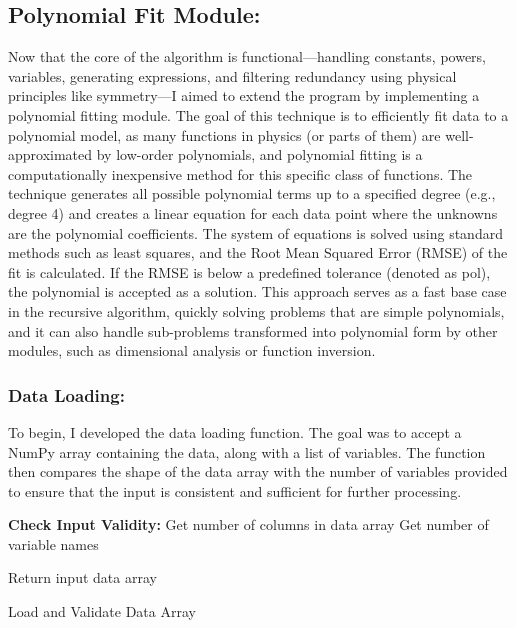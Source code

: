 \documentclass{article}
\begin{document}
\subsection{Polynomial Fit Module: }

Now that the core of the algorithm is functional—handling constants, powers, variables, generating expressions, and filtering redundancy using physical principles like symmetry—I aimed to extend the program by implementing a polynomial fitting module. The goal of this technique is to efficiently fit data to a polynomial model, as many functions in physics (or parts of them) are well-approximated by low-order polynomials, and polynomial fitting is a computationally inexpensive method for this specific class of functions. The technique generates all possible polynomial terms up to a specified degree (e.g., degree 4) and creates a linear equation for each data point where the unknowns are the polynomial coefficients. The system of equations is solved using standard methods such as least squares, and the Root Mean Squared Error (RMSE) of the fit is calculated. If the RMSE is below a predefined tolerance (denoted as pol), the polynomial is accepted as a solution. This approach serves as a fast base case in the recursive algorithm, quickly solving problems that are simple polynomials, and it can also handle sub-problems transformed into polynomial form by other modules, such as dimensional analysis or function inversion.\\


\subsubsection{Data Loading:}

To begin, I developed the data loading function. The goal was to accept a NumPy array containing the data, along with a list of variables. The function then compares the shape of the data array with the number of variables provided to ensure that the input is consistent and sufficient for further processing.\\



\begin{algorithm}[H]
\SetAlgoLined
{}

\textbf{Check Input Validity:}\;
Get number of columns in data array\;
Get number of variable names\;


Return input data array\;

\caption{Load and Validate Data Array}
\label{alg:load_data_array} %
\end{algorithm}\\
\end{document}
